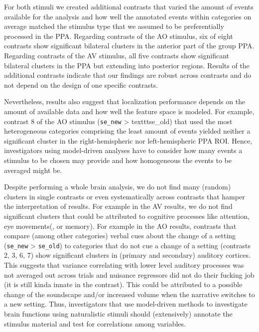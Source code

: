 \documentclass[english]{article}
\begin{document}
For both stimuli we created additional contrasts that varied the amount of
events available for the analysis and how well the annotated events within
categories on average matched the stimulus type that we assumed to be
preferentially processed in the PPA.
Regarding contrasts of the AO stimulus, six of eight contrasts show significant
bilateral clusters in the anterior part of the group PPA.
Regarding contrasts of the AV stimulus, all five contrasts show significant
bilateral clusters in the PPA but extending into posterior regions.
Results of the additional contrasts indicate that our findings are robust across
contrasts and do not depend on the design of one specific contrasts.

Nevertheless, results also suggest that localization performance depends on the
amount of available data and how well the feature space is modeled.
For example, contrast 8 of the AO stimulus (\texttt{se\_new} > texttt{se\_old})
that used the most heterogeneous categories comprising the least amount of
events yielded neither a significant cluster in the right-hemispheric nor
left-hemispheric PPA ROI.
Hence, investigators using model-driven analyses have to consider how many
events a stimulus to be chosen may provide and how homogeneous the events to be
averaged might be.

Despite performing a whole brain analysis, we do not find many (random) clusters
in single contrasts or even systematically across contrasts that hamper the
interpretation of results.
For example in the AV results, we do not find significant clusters that could be
attributed to cognitive processes like attention, eye movements(, or
memory).
For example in the AO results, contrasts that compare (among other categories)
verbal cues about the change of a setting (\texttt{se\_new} > \texttt{se\_old})
to categories that do not cue a change of a setting (contrasts 2, 3, 6, 7) show
significant clusters in (primary and secondary) auditory cortices.
This suggests that variance correlating with lower level auditory processes was
not averaged out across trials and nuisance regressors did not do their fucking
job (it is still kinda innate in the contrast).
This could be attributed to a possible change of the soundscape and/or increased
volume when the narrative switches to a new setting.
Thus, investigators that use model-driven methods to investigate brain functions
using naturalistic stimuli should (extensively) annotate the stimulus material
and test for correlations among variables.
\end{document}
